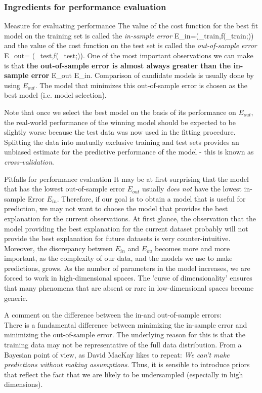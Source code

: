 \subsubsection{Ingredients for performance evaluation}
\begin{mybox}{Measure for evaluating performance}
	The value of the cost function for the best fit model on the training set is called the \emph{in-sample error}
	\be 
	\label{eq:errorInsample}
	E_{in}=\mC(\my_{train},f(\mX_{train};\mt))
	\ee 
	and the value of the cost function on the test set is called the \emph{out-of-sample error}
	\be 
	\label{eq:errorOutsample}
	E_{out}= \mC(\my_{test},f(\mX_{test};\mt)).
	\ee 
	One of the most important observations we can make is that \textbf{the out-of-sample error is almost always greater than the in-sample error}
	\be 
	\label{eq:errorComparison}
	E_{out} \geq E_{in}.
	\ee 
	Comparison of candidate models is usually done by using $E_{out}$. The model that minimizes this out-of-sample error is chosen as the best model (i.e. model selection).
\end{mybox}
Note that once we select the best model on the basis of its performance on $E_{out}$, the real-world performance of the winning model should be expected to be slightly worse because the test data was now used in the fitting procedure.\\
Splitting the data into mutually exclusive training and test sets provides an unbiased estimate for the predictive performance of the model - this is known as \emph{cross-validation}.
\begin{mybox}{Pitfalls for performance evaluation}
	\label{subsubsec:performanceevalCurseDimensionality}
	It may be at first surprising that the model that has the lowest out-of-sample error $E_{out}$ usually \emph{does not} have the lowest in-sample Error $E_{in}$. Therefore, if our goal is to obtain a model that is useful for prediction, we may not want to choose the model that provides the best explanation for the current observations. At first glance, the observation that the model providing the best explanation for the current dataset probably will not provide the best explanation for future datasets is very counter-intuitive. \\
Moreover, the discrepancy between $E_{in}$ and $E_{ou}$ becomes more and more important, as the complexity of our data, and the models we use to make predictions, grows. As the number of parameters in the model increases, we are forced to work in high-dimensional spaces. The ’curse of dimensionality’ ensures that many phenomena that are absent or rare in low-dimensional spaces become generic.
\end{mybox}
A comment on the difference between the in-and out-of-sample errors:\\
There is a fundamental difference between minimizing the in-sample error and minimizing the out-of-sample error. The underlying reason for this is that the training data may not be representative of the full data distribution. From a Bayesian point of view, as David MacKay likes to repeat: \emph{We can't make predictions without making assumptions}. Thus, it is sensible to introduce priors that reflect the fact that we are likely to be undersampled (especially in high dimensions).
